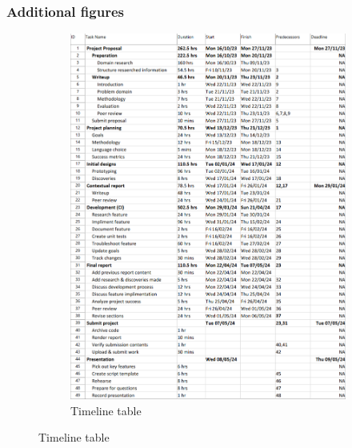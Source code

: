
\subsubsection{Additional figures}

\begin{figure}
    \vspace{-50px}
    \centering
    \caption{Project Timeline}
    \label{fig:ProjectTimeline}
    \begin{subfigure}[t]{0.5\textwidth}
        \caption{Timeline table}
        \label{fig:ProjectTimelineChart}
        \includegraphics[width=0.5\textheight]{Figures/TimelineChart.png}
    \end{subfigure}

\end{figure}
